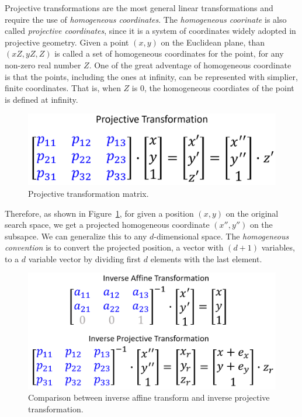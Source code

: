 Projective transformations are the most general linear transformations and require the use of \textit{homogeneous coordinates}.
The \textit{homogeneous coorinate} is also called \textit{projective coordinates}, 
since it is a system of coordinates widely adopted in projective geometry.
Given a point $(x,y)$ on the Euclidean plane, 
than $(xZ, yZ, Z)$ is called a set of homogeneous coordinates for the point, for any non-zero real number $Z$.
One of the great adventage of homogeneous coordinate is that the points, 
including the ones at infinity, can be represented with simplier, finite coordinates.
That is, when $Z$ is $0$, the homogeneous coordiates of the point is defined at infinity.

\begin{figure}
\centering
\includegraphics[width=\textwidth]{Projective_matrix}
\caption{Projective transformation matrix.}\label{fig:Projective_matrix}
\end{figure} 

Therefore, as shown in Figure~\ref{fig:Projective_matrix}, 
for given a position $(x,y)$ on the original search space, 
we get a projected homogeneous coordinate $(x'', y'')$ on the subsapce.  
We can generalize this to any $d$-dimensional space.
The \textit{homogeneous convention} is to convert the projected position, a vector with $(d+1)$ variables, to a $d$ variable vector 
by dividing first $d$ elements with the last element.

\begin{figure}
\centering
\includegraphics[width=\textwidth]{Inverse_transform}
\caption{Comparison between inverse affine transform and inverse projective transformation.}\label{fig:Inverse_transform}
\end{figure} 

